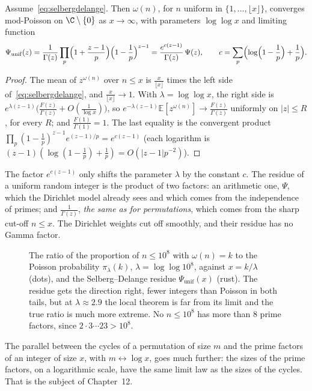 \begin{corollary}\label{cor:unifomega}
Assume~\eqref{eq:selbergdelange}. Then $\omega(n)$, for $n$ uniform in $\{1,\dots,\lfloor x\rfloor\}$, converges mod-Poisson on $\C\setminus\{0\}$ as $x\to\infty$, with parameters $\log\log x$ and limiting function
\[
\Psi_{\mathrm{unif}}(z)=\frac1{\Gamma(z)}\prod_p\Bigl(1+\frac{z-1}p\Bigr)\Bigl(1-\frac1p\Bigr)^{z-1}=\frac{e^{c(z-1)}}{\Gamma(z)}\,\Psi(z),\qquad c=\sum_p\Bigl(\log\Bigl(1-\frac1p\Bigr)+\frac1p\Bigr).
\]
\end{corollary}
\begin{proof}
The mean of $z^{\omega(n)}$ over $n\le x$ is $\frac x{\lfloor x\rfloor}$ times the left side of~\eqref{eq:selbergdelange}, and $\frac x{\lfloor x\rfloor}\to1$. With $\lambda=\log\log x$, the right side is
$e^{\lambda(z-1)}\bigl(\frac{F(z)}{\Gamma(z)}+O(\frac1{\log x})\bigr)$, so $e^{-\lambda(z-1)}\mathbb E[z^{\omega(n)}]\to\frac{F(z)}{\Gamma(z)}$ uniformly on $|z|\le R$, for every $R$; and $\frac{F(1)}{\Gamma(1)}=1$.
The last equality is the convergent product $\prod_p(1-\frac1p)^{z-1}e^{(z-1)/p}=e^{c(z-1)}$ (each logarithm is $(z-1)(\log(1-\frac1p)+\frac1p)=O(|z-1|p^{-2})$).
\end{proof}

The factor $e^{c(z-1)}$ only shifts the parameter $\lambda$ by the constant $c$. The residue of a uniform random integer is the product of two factors:
an arithmetic one, $\Psi$, which the Dirichlet model already sees and which comes from the independence of primes; and $\frac1{\Gamma(z)}$, \emph{the same as for permutations}, which comes from the sharp cut-off $n\le x$. The Dirichlet weights cut off
smoothly, and their residue has no Gamma factor.

\begin{figure}[ht]
\centering{}
\caption{The ratio of the proportion of $n\le10^8$ with $\omega(n)=k$ to the Poisson probability $\pi_\lambda(k)$, $\lambda=\log\log10^8$, against $x=k/\lambda$ (dots), and the Selberg--Delange residue $\Psi_{\mathrm{unif}}(x)$ (rust). The residue gets the
direction right, fewer integers than Poisson in both tails, but at $\lambda\approx2.9$ the local theorem is far from its limit and the true ratio is much more extreme. No $n\le10^8$ has more than $8$ prime factors, since $2\cdot3\cdots23>10^8$.}
\label{fig:omegaratio}
\end{figure}

The parallel between the cycles of a permutation of size $m$ and the prime factors of an integer of size $x$, with $m\leftrightarrow\log x$, goes much further: the sizes of the prime factors, on a logarithmic scale, have the same limit
law as the sizes of the cycles. That is the subject of Chapter~12.

